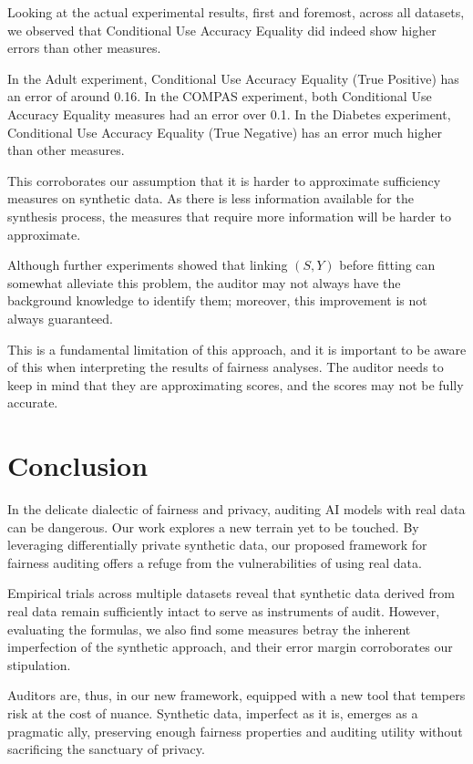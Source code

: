 \documentclass[manuscript,screen,review,anonymous]{acmart}
\begin{document}
Looking at the actual experimental results, first and foremost, across all datasets, we observed that Conditional Use Accuracy Equality did indeed show higher errors than other measures.

In the Adult experiment, Conditional Use Accuracy Equality (True Positive) has an error of around 0.16. In the COMPAS experiment, both Conditional Use Accuracy Equality measures had an error over 0.1. In the Diabetes experiment, Conditional Use Accuracy Equality (True Negative) has an error much higher than other measures.

This corroborates our assumption that it is harder to approximate sufficiency measures on synthetic data. As there is less information available for the synthesis process, the measures that require more information will be harder to approximate.

Although further experiments showed that linking $(S,Y)$ before fitting can somewhat alleviate this problem, the auditor may not always have the background knowledge to identify them; moreover, this improvement is not always guaranteed.

This is a fundamental limitation of this approach, and it is important to be aware of this when interpreting the results of fairness analyses. The auditor needs to keep in mind that they are approximating scores, and the scores may not be fully accurate.

\section{Conclusion}

In the delicate dialectic of fairness and privacy, auditing AI models with real data can be dangerous. Our work explores a new terrain yet to be touched. By leveraging differentially private synthetic data, our proposed framework for fairness auditing offers a refuge from the vulnerabilities of using real data.

Empirical trials across multiple datasets reveal that synthetic data derived from real data remain sufficiently intact to serve as instruments of audit. However, evaluating the formulas, we also find some measures betray the inherent imperfection of the synthetic approach, and their error margin corroborates our stipulation.

Auditors are, thus, in our new framework, equipped with a new tool that tempers risk at the cost of nuance. Synthetic data, imperfect as it is, emerges as a pragmatic ally, preserving enough fairness properties and auditing utility without sacrificing the sanctuary of privacy.
\end{document}
